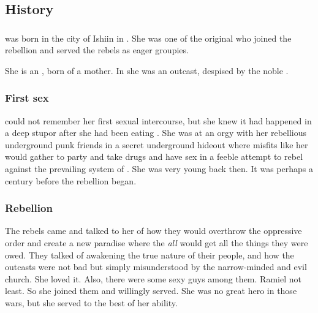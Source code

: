 \subsection{History}





\subsubsection{\Merkyrah}
\Achsah{} was born in the city of Ishiin in \Merkyrah. 
She was one of the original  who joined the rebellion and served the rebels as eager groupies. 

She is an \quo{\ashenblood}, born of a \nephilic{} mother. 
In \Merkyrah{} she was an outcast, despised by the noble \resphain. 





\subsubsection{First sex}
\Achsah could not remember her first sexual intercourse, but she knew it had happened in a deep stupor after she had been eating . 
She was at an orgy with her rebellious underground \bezed punk friends in a secret underground hideout where misfits like her would gather to party and take drugs and have sex in a feeble attempt to rebel against the prevailing system of \Merkyrah. 
She was very young back then.
It was perhaps a century before the rebellion began. 





\subsubsection{Rebellion}
The rebels came and talked to her of how they would overthrow the oppressive order and create a new paradise where the \resphain\dash \emph{all} \resphain\dash would get all the things they were owed. 
They talked of awakening the true nature of their people, and how the outcasts were not bad but simply misunderstood by the narrow-minded and evil church. 
She loved it. 
Also, there were some sexy guys among them. 
Ramiel not least. 
So she joined them and willingly served. 
She was no great hero in those wars, but she served to the best of her ability. 






